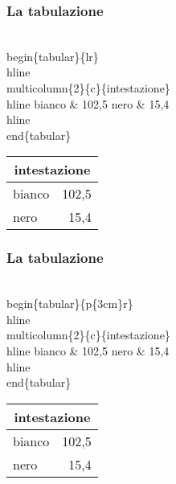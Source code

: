 \documentclass[svgnames,%
	ucs,%
	pdftex]{guitbeamer}
\begin{document}
\begin{frame}
  \frametitle{La tabulazione}
	\begin{LaTeXcode}
		\\begin\{tabular\}\{lr\}\
		\\hline \n
		\alert{\\multicolumn\{2\}\{c\}\{intestazione\}\bs\bs} \
		\\hline \n
		\hspace*{5ex}bianco \& 102,5 \bs\bs\n
		\hspace*{5ex}nero   \& 15,4 \bs\bs\
		\\hline\n
		\\end\{tabular\}
	\end{LaTeXcode}
	\begin{LaTeXoutput}
		\begin{tabular}{lr}\hline
		\multicolumn{2}{c}{intestazione}\\\hline
		bianco & 102,5 \\
		nero   & 15,4 \\\hline
		\end{tabular}
	\end{LaTeXoutput}
\end{frame}
\begin{frame}
  \frametitle{La tabulazione}
	\begin{LaTeXcode}
		\\begin\{tabular\}\{\alert{p\{3cm\}}r\}\
		\\hline \n
		\\multicolumn\{2\}\{c\}\{intestazione\}\bs\bs \
		\\hline \n
		\hspace*{5ex}bianco \& 102,5 \bs\bs\n
		\hspace*{5ex}nero   \& 15,4 \bs\bs\
		\\hline\n
		\\end\{tabular\}
	\end{LaTeXcode}
	\begin{LaTeXoutput}
		\begin{tabular}{p{3cm}r}\hline
		\multicolumn{2}{c}{intestazione}\\\hline
		bianco & 102,5 \\
		nero   & 15,4 \\\hline
		\end{tabular}
	\end{LaTeXoutput}
\end{frame}
\end{document}
